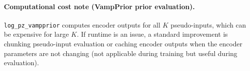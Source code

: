 \paragraph{Computational cost note (VampPrior prior evaluation).}
\texttt{log\_pz\_vampprior} computes encoder outputs for all \(K\) pseudo-inputs, which can be expensive for large \(K\). If runtime is an issue, a standard improvement is chunking pseudo-input evaluation or caching encoder outputs when the encoder parameters are not changing (not applicable during training but useful during evaluation).

